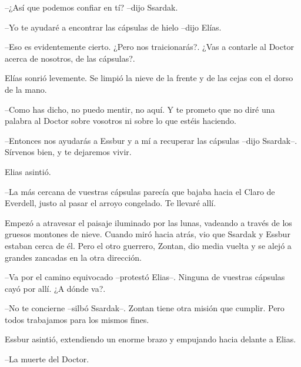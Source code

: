 --¿Así que podemos confiar en tí? --dijo Ssardak.



--Yo te ayudaré a encontrar las cápsulas de hielo --dijo Elías.



--Eso es evidentemente cierto. ¿Pero nos traicionarás?. ¿Vas a contarle al Doctor acerca de nosotros, de las cápsulas?.



Elías sonrió levemente. Se limpió la nieve de la frente y de las cejas con el dorso de la mano. 


--Como has dicho, no puedo mentir, no aquí. Y te prometo que no diré una palabra al Doctor sobre vosotros ni sobre lo que estéis haciendo.



--Entonces nos ayudarás a Essbur y a mí a recuperar las cápsulas --dijo Ssardak--. Sírvenos bien, y te dejaremos vivir.



Elias asintió.


--La más cercana de vuestras cápsulas parecía que bajaba hacia el Claro de Everdell, justo al pasar el arroyo congelado. Te llevaré allí. 



Empezó a atravesar el paisaje iluminado por las lunas, vadeando a través de los gruesos montones de nieve. Cuando miró hacia atrás, vio que Ssardak y Essbur estaban cerca de él. Pero el otro guerrero, Zontan, dio media vuelta y se alejó a grandes zancadas en la otra dirección.



--Va por el camino equivocado --protestó Elias--. Ninguna de vuestras cápsulas cayó por allí. ¿A dónde va?.



--No te concierne --silbó Ssardak--. Zontan tiene otra misión que cumplir. Pero todos trabajamos para los mismos fines.



Essbur asintió, extendiendo un enorme brazo y empujando hacia delante a Elias. 



--La muerte del Doctor.
